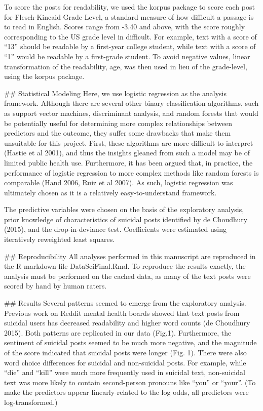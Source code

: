 To score the posts for readability, we used the korpus package to score each post for Flesch-Kincaid Grade Level, a standard measure of how difficult a passage is to read in English. Scores range from -3.40 and above, with the score roughly corresponding to the US grade level in difficult. For example, text with a score of “13” should be readable by a first-year college student, while text with a score of “1” would be readable by a first-grade student. To avoid negative values, linear transformation of the readability, age, was then used in lieu of the grade-level, using the korpus package.


## Statistical Modeling
Here, we use logistic regression as the analysis framework. Although there are several other binary classification algorithms, such as support vector machines, discriminant analysis, and random forests that would be potentially useful for determining more complex relationships between predictors and the outcome, they suffer some drawbacks that make them unsuitable for this project. First, these algorithms are more difficult to interpret (Hastie et al 2001), and thus the insights gleaned from such a model may be of limited public health use. Furthermore, it has been argued that, in practice, the performance of logistic regression to more complex methods like random forests is comparable (Hand 2006, Ruiz et al 2007). As such, logistic regression was ultimately chosen as it is a relatively easy-to-understand framework. 


The predictive variables were chosen on the basis of the exploratory analysis, prior knowledge of characteristics of suicidal posts identified by de Choudhury (2015), and the drop-in-deviance test. Coefficients were estimated using iteratively reweighted least squares.


## Reproducibility
All analyses performed in this manuscript are reproduced in the R markdown file DataSciFinal.Rmd. To reproduce the results exactly, the analysis must be performed on the cached data, as many of the text posts were scored by hand by human raters. 


## Results
Several patterns seemed to emerge from the exploratory analysis. Previous work on Reddit mental health boards showed that text posts from suicidal users has decreased readability and higher word counts (de Choudhury 2015). Both patterns are replicated in our data (Fig.1). Furthermore, the sentiment of suicidal posts seemed to be much more negative, and the magnitude of the score indicated that suicidal posts were longer (Fig. 1). There were also word choice differences for suicidal and non-suicidal posts. For example, while “die” and “kill” were much more frequently used in suicidal text, non-suicidal text was more likely to contain second-person pronouns like “you” or “your”. (To make the predictors appear linearly-related to the log odds, all predictors were log-transformed.)



